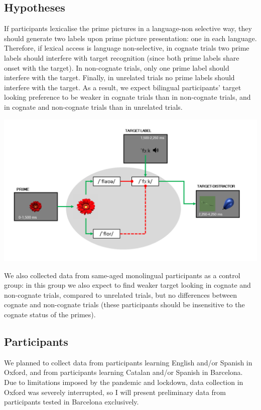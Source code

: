 \documentclass[
]{article}
\begin{document}
\hypertarget{hypotheses}{%
\subsection{Hypotheses}\label{hypotheses}}

If participants lexicalise the prime pictures in a language-non
selective way, they should generate two labels upon prime picture
presentation: one in each language. Therefore, if lexical access is
language non-selective, in cognate trials two prime labels should
interfere with target recognition (since both prime labels share onset
with the target). In non-cognate trials, only one prime label should
interfere with the target. Finally, in unrelated trials no prime labels
should interfere with the target. As a result, we expect bilingual
participants' target looking preference to be weaker in cognate trials
than in non-cognate trials, and in cognate and non-cognate trials than
in unrelated trials.

\includegraphics{img/diagram.png}

We also collected data from same-aged monolingual participants as a
control group: in this group we also expect to find weaker target
looking in cognate and non-cognate trials, compared to unrelated trials,
but no differences between cognate and non-cognate trials (these
participants should be insensitive to the cognate status of the primes).

\hypertarget{participants}{%
\subsection{Participants}\label{participants}}

We planned to collect data from participants learning English and/or
Spanish in Oxford, and from participants learning Catalan and/or Spanish
in Barcelona. Due to limitations imposed by the pandemic and lockdown,
data collection in Oxford was severely interrupted, so I will present
preliminary data from participants tested in Barcelona exclusively.
\end{document}
